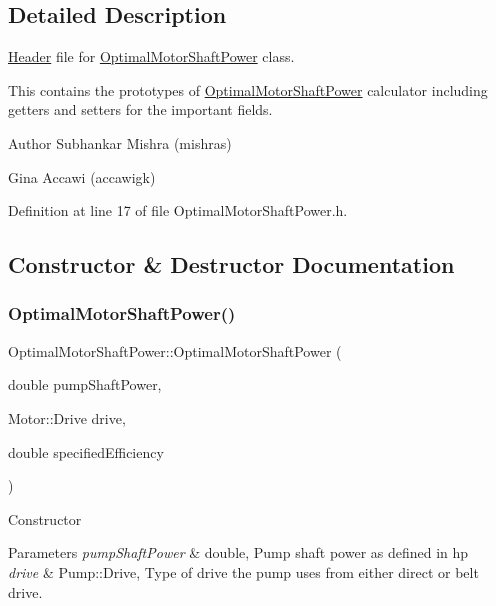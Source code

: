\subsection{Detailed Description}
\hyperlink{class_header}{Header} file for \hyperlink{class_optimal_motor_shaft_power}{Optimal\+Motor\+Shaft\+Power} class. 

This contains the prototypes of \hyperlink{class_optimal_motor_shaft_power}{Optimal\+Motor\+Shaft\+Power} calculator including getters and setters for the important fields.

\begin{DoxyAuthor}{Author}
Subhankar Mishra (mishras) 

Gina Accawi (accawigk) 
\end{DoxyAuthor}


Definition at line 17 of file Optimal\+Motor\+Shaft\+Power.\+h.



\subsection{Constructor \& Destructor Documentation}
\mbox{\label{class_optimal_motor_shaft_power_ad830e1f8a7931e3c6bec5f8828d57e83}} 
\subsubsection{\texorpdfstring{Optimal\+Motor\+Shaft\+Power()}{OptimalMotorShaftPower()}}
{\footnotesize\ttfamily Optimal\+Motor\+Shaft\+Power\+::\+Optimal\+Motor\+Shaft\+Power (\begin{DoxyParamCaption}\item[{double}]{pump\+Shaft\+Power,  }\item[{Motor\+::\+Drive}]{drive,  }\item[{double}]{specified\+Efficiency }\end{DoxyParamCaption})\hspace{0.3cm}{\ttfamily [inline]}}

Constructor 
\begin{DoxyParams}{Parameters}
{\em pump\+Shaft\+Power} & double, Pump shaft power as defined in hp \\
\hline
{\em drive} & Pump\+::\+Drive, Type of drive the pump uses from either direct or belt drive. \\
\hline
\end{DoxyParams}


